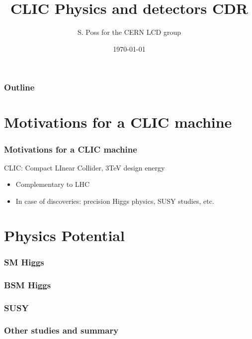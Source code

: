 \documentclass{beamer}
\author{S. Poss for the CERN LCD group}
\institute[CERN]{CERN}
\title[]{CLIC Physics and detectors CDR}
\date{\today}
\begin{document}
{

\begin{frame}
	\titlepage
\end{frame}

\begin{frame}
\frametitle{Outline}
\tableofcontents
\end{frame}
}

\section[Motivations for CLIC]{Motivations for a CLIC machine}%
\begin{frame}
 \frametitle{Motivations for a CLIC machine}
 CLIC: Compact LInear Collider, 3TeV design energy
 \begin{itemize}
   \item Complementary to LHC
   \item In case of discoveries: precision Higgs physics, SUSY studies, etc.
 \end{itemize}
 
\end{frame}

\section{Physics Potential}
\begin{frame}
\frametitle{SM Higgs}

\end{frame}
\begin{frame}
\frametitle{BSM Higgs}
\end{frame}
\begin{frame}
\frametitle{SUSY}
\end{frame}
\begin{frame}
\frametitle{Other studies and summary}

\end{frame}
\end{document}
